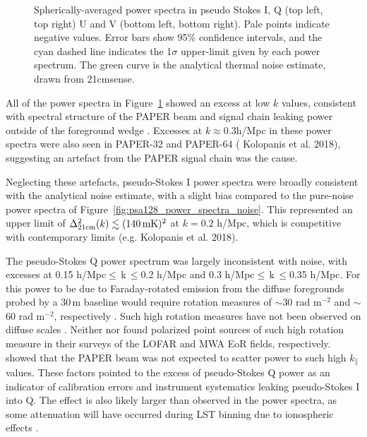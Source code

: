 \begin{figure}
\begin{tabular}{ll}
\end{tabular}
\caption[Spherically-averaged PAPER-128 power spectra.]{Spherically-averaged power spectra in pseudo Stokes I, Q (top left, top right) U and V (bottom left, bottom right). Pale points indicate negative values. Error bars show 95\% confidence intervals, and the cyan dashed line indicates the 1$\sigma$ upper-limit given by each power spectrum. The green curve is the analytical thermal noise estimate, drawn from {\sc 21cmsense}.}
\label{fig:psa128_power_spectra_data}
\end{figure}
 
All of the power spectra in Figure~\ref{fig:psa128_power_spectra_data} showed an excess at low $k$ values, consistent with spectral structure of the PAPER beam and signal chain leaking power outside of the foreground wedge \citep{Pober.13, Kerrigan.18}. Excesses at $k\approx0.3$h/Mpc in these power spectra were also seen in PAPER-32 \citep{Moore.17} and PAPER-64 ({\color{red} Kolopanis et al. 2018}), suggesting an artefact from the PAPER signal chain was the cause.

Neglecting these artefacts, pseudo-Stokes I power spectra were broadly consistent with the analytical noise estimate, with a slight bias compared to the pure-noise power spectra of Figure~\ref{fig:psa128_power_spectra_noise}. This represented an upper limit of $\Delta^2_{\rm 21cm}(k) \lesssim (140\, {\rm mK})^2$ at $k=0.2$ h/Mpc, which is competitive with contemporary limits (e.g. {\color{red} Kolopanis et al. 2018}).

The pseudo-Stokes Q power spectrum was largely inconsistent with noise, with excesses at 0.15 h/Mpc$\leqslant\,$k$\,\leqslant$0.2 h/Mpc and 0.3 h/Mpc$\leqslant\,$k$\,\leqslant$0.35 h/Mpc. For this power to be due to Faraday-rotated emission from the diffuse foregrounds probed by a 30\,m baseline would require rotation measures of $\sim$30 rad m$^{-2}$ and $\sim$60 rad m$^{-2}$, respectively \citep{Moore.13}. Such high rotation measures have not been observed on diffuse scales \citep[e.g.][]{Oppermann.12, Bernardi.13, Lenc.16}. Neither \cite{Asad.16} nor \cite{Lenc.16} found polarized point sources of such high rotation measure in their surveys of the LOFAR and MWA EoR fields, respectively. 
\cite{Kohn.16} showed that the PAPER beam was not expected to scatter power to such high $k_{\parallel}$ values.
These factors pointed to the excess of pseudo-Stokes Q power as an indicator of calibration errors and instrument systematics leaking pseudo-Stokes I into Q. The effect is also likely larger than observed in the power spectra, as some attenuation will have occurred during LST binning due to ionospheric effects \citep[][{\color{red}; Martinot et al. (2018)}]{Moore.17}.


